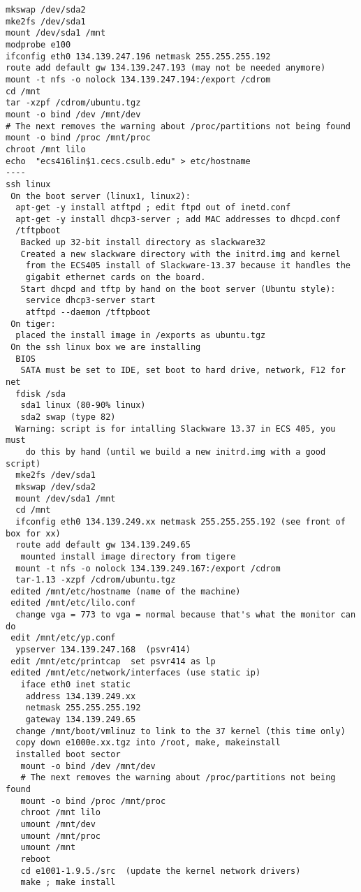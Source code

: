 \begin{verbatim}
mkswap /dev/sda2
mke2fs /dev/sda1
mount /dev/sda1 /mnt
modprobe e100
ifconfig eth0 134.139.247.196 netmask 255.255.255.192
route add default gw 134.139.247.193 (may not be needed anymore)
mount -t nfs -o nolock 134.139.247.194:/export /cdrom
cd /mnt
tar -xzpf /cdrom/ubuntu.tgz
mount -o bind /dev /mnt/dev
# The next removes the warning about /proc/partitions not being found
mount -o bind /proc /mnt/proc
chroot /mnt lilo
echo  "ecs416lin$1.cecs.csulb.edu" > etc/hostname
----
ssh linux
 On the boot server (linux1, linux2):
  apt-get -y install atftpd ; edit ftpd out of inetd.conf
  apt-get -y install dhcp3-server ; add MAC addresses to dhcpd.conf
  /tftpboot
   Backed up 32-bit install directory as slackware32
   Created a new slackware directory with the initrd.img and kernel 
    from the ECS405 install of Slackware-13.37 because it handles the
    gigabit ethernet cards on the board.
   Start dhcpd and tftp by hand on the boot server (Ubuntu style):
    service dhcp3-server start
    atftpd --daemon /tftpboot
 On tiger:
  placed the install image in /exports as ubuntu.tgz
 On the ssh linux box we are installing
  BIOS
   SATA must be set to IDE, set boot to hard drive, network, F12 for net
  fdisk /sda
   sda1 linux (80-90% linux)
   sda2 swap (type 82)
  Warning: script is for intalling Slackware 13.37 in ECS 405, you must
    do this by hand (until we build a new initrd.img with a good script)
  mke2fs /dev/sda1
  mkswap /dev/sda2
  mount /dev/sda1 /mnt
  cd /mnt
  ifconfig eth0 134.139.249.xx netmask 255.255.255.192 (see front of box for xx)
  route add default gw 134.139.249.65
   mounted install image directory from tigere
  mount -t nfs -o nolock 134.139.249.167:/export /cdrom
  tar-1.13 -xzpf /cdrom/ubuntu.tgz
 edited /mnt/etc/hostname (name of the machine)
 edited /mnt/etc/lilo.conf
  change vga = 773 to vga = normal because that's what the monitor can do
 edit /mnt/etc/yp.conf
  ypserver 134.139.247.168  (psvr414)
 edit /mnt/etc/printcap  set psvr414 as lp
 edited /mnt/etc/network/interfaces (use static ip)
   iface eth0 inet static
    address 134.139.249.xx
    netmask 255.255.255.192
    gateway 134.139.249.65
  change /mnt/boot/vmlinuz to link to the 37 kernel (this time only)
  copy down e1000e.xx.tgz into /root, make, makeinstall
  installed boot sector
   mount -o bind /dev /mnt/dev
   # The next removes the warning about /proc/partitions not being found
   mount -o bind /proc /mnt/proc
   chroot /mnt lilo
   umount /mnt/dev
   umount /mnt/proc
   umount /mnt
   reboot
   cd e1001-1.9.5./src  (update the kernel network drivers)
   make ; make install


\end{verbatim}
